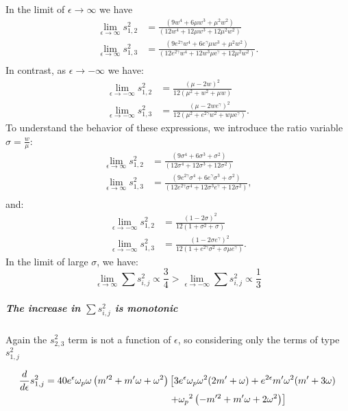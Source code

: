 In the limit of $\epsilon\to\infty$ we have %
\begin{eqnarray*}
\lim_{\epsilon\to\infty}{s^2_{1,2}}&=\frac{\left(9 w^4+6 \mu  w^3+\mu ^2 w^2\right)}{\left(12 w^4+12 \mu  w^3+12 \mu ^2 w^2\right)}\\
\lim_{\epsilon\to\infty}{s^2_{1,3}}&=\frac{\left(9 e^{2 \gamma } w^4+6 e^{\gamma } \mu  w^3+\mu ^2 w^2\right)}{\left(12 e^{2 \gamma } w^4+12 w^3 \text{$\mu $e}^{\gamma }+12 \mu ^2 w^2\right)}.\\
\end{eqnarray*}
In contrast, as $\epsilon\to-\infty$ we have:
\begin{eqnarray*}
\lim_{\epsilon\to-\infty}{s^2_{1,2}}&=\frac{(\mu -2 w)^2}{12 \left(\mu ^2+w^2+\mu  w\right)}\\
\lim_{\epsilon\to-\infty}{s^2_{1,3}}&=\frac{\left(\mu-2 w e^{\gamma }\right)^2}{12\left(\mu ^2+e^{2 \gamma } w^2+w \text{$\mu $e}^{\gamma }\right)}.
\end{eqnarray*}
To understand the behavior of these expressions, we introduce the ratio variable $\sigma=\frac{w}{\mu}$: %
\begin{eqnarray*}
\lim_{\epsilon\to\infty}{s^2_{1,2}}&=\frac{\left(9 \sigma^4+6 \sigma^3+\sigma^2\right)}{\left(12 \sigma^4+12 \sigma^3+12 \sigma^2\right)}\\
\lim_{\epsilon\to\infty}{s^2_{1,3}}&=\frac{\left(9 e^{2 \gamma } \sigma^4+6 e^{\gamma } \sigma^3+\sigma^2\right)}{\left(12 e^{2 \gamma } \sigma^4+12 \sigma^3e^{\gamma }+12\sigma^2\right)},\\
\end{eqnarray*}
and:
\begin{eqnarray*}
\lim_{\epsilon\to-\infty}{s^2_{1,2}}&=\frac{(1 -2\sigma)^2}{12 \left(1+\sigma^2+\sigma\right)}\\
\lim_{\epsilon\to-\infty}{s^2_{1,3}}&=\frac{\left(1-2 \sigma e^{\gamma }\right)^2}{12\left(1+e^{2 \gamma } \sigma^2+\sigma \mu e^{\gamma }\right)}.
\end{eqnarray*}
In the limit of large $\sigma$, we have: %
\[
\lim_{\epsilon\to\infty}\sum{s^2_{i,j}}\propto\frac{3}{4}>\lim_{\epsilon\to-\infty}\sum{s^2_{i,j}}\propto\frac{1}{3}
\]
\subparagraph{The increase in $\sum{s^2_{i,j}}$ is monotonic}
Again the ${s^2_{2,3}}$ term is not a function of $\epsilon$, so considering only the terms of type ${s^2_{1,j}}$
\begin{widetext}
\[
\begin{aligned}
\frac{d}{d\epsilon}{s^2_{1,j}} = 40 e^\epsilon {\omega_p} \omega \left(m'^2+m' \omega+\omega^2\right) &\left[3 e^\epsilon {\omega_p} \omega^2 (2 m'+\omega)+e^{2 \epsilon} m' \omega^2 (m'+3 \omega)\right.\\
&\left. +{\omega_p}^2
   \left(-m'^2+m' \omega+2 \omega^2\right)\right]
\end{aligned}
\]
\end{widetext}

